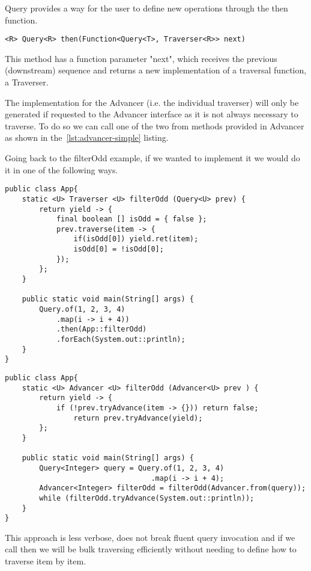 Query provides a way for the user to define new operations through the then function.
\begin{lstlisting}[caption={Traversal function generator},captionpos=b]
<R> Query<R> then(Function<Query<T>, Traverser<R>> next)
\end{lstlisting}
This method has a function parameter "next", which receives the previous (downstream) sequence and returns a new implementation of a traversal function, a Traverser.


 The implementation for the Advancer (i.e. the individual traverser) will only be generated if requested to the Advancer interface as it is not always necessary to traverse. To do so we can call one of the two from methods provided in Advancer as shown in the~\ref{lst:advancer-simple} listing.

\newpage
Going back to the filterOdd example, if we wanted to implement it we would do it in one of the following ways.
\begin{lstlisting}[caption={filterOdd using Query and Traverser},captionpos=b]
public class App{
	static <U> Traverser <U> filterOdd (Query<U> prev) {
		return yield -> {
			final boolean [] isOdd = { false };
			prev.traverse(item -> {
				if(isOdd[0]) yield.ret(item);
				isOdd[0] = !isOdd[0];
			});
		};
	}

	public static void main(String[] args) {
		Query.of(1, 2, 3, 4)
            .map(i -> i + 4))
            .then(App::filterOdd)
            .forEach(System.out::println);
	}
}
\end{lstlisting}

\begin{lstlisting}[caption={filterOdd using Advancer},captionpos=b]
public class App{
	static <U> Advancer <U> filterOdd (Advancer<U> prev ) {
		return yield -> {
			if (!prev.tryAdvance(item -> {})) return false;
				return prev.tryAdvance(yield);
		};
	}

	public static void main(String[] args) {
        Query<Integer> query = Query.of(1, 2, 3, 4)
                                  .map(i -> i + 4);
        Advancer<Integer> filterOdd = filterOdd(Advancer.from(query));
        while (filterOdd.tryAdvance(System.out::println));
	}
}
\end{lstlisting}

This approach is less verbose, does not break fluent query invocation and if we call then we will be bulk traversing efficiently without needing to define how to traverse item by item.

